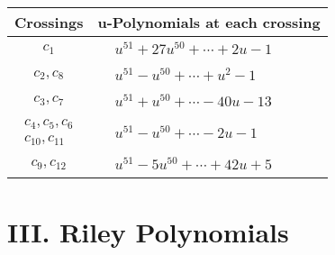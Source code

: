 \documentclass[1p]{elsarticle_modified}
\theoremstyle{definition}
\begin{document}
\begin{tabular}{m{50pt}|m{274pt}}
Crossings & \hspace{64pt}u-Polynomials at each crossing \\
\hline $$\begin{aligned}c_{1}\end{aligned}$$&$\begin{aligned}
&u^{51}+27 u^{50}+\cdots+2 u-1
\end{aligned}$\\
\hline $$\begin{aligned}c_{2},c_{8}\end{aligned}$$&$\begin{aligned}
&u^{51}- u^{50}+\cdots+u^2-1
\end{aligned}$\\
\hline $$\begin{aligned}c_{3},c_{7}\end{aligned}$$&$\begin{aligned}
&u^{51}+u^{50}+\cdots-40 u-13
\end{aligned}$\\
\hline $$\begin{aligned}c_{4},c_{5},c_{6}\\c_{10},c_{11}\end{aligned}$$&$\begin{aligned}
&u^{51}- u^{50}+\cdots-2 u-1
\end{aligned}$\\
\hline $$\begin{aligned}c_{9},c_{12}\end{aligned}$$&$\begin{aligned}
&u^{51}-5 u^{50}+\cdots+42 u+5
\end{aligned}$\\
\hline
\end{tabular}\newpage\renewcommand{\arraystretch}{1}
\centering \section*{ III. Riley Polynomials}
\end{document}
